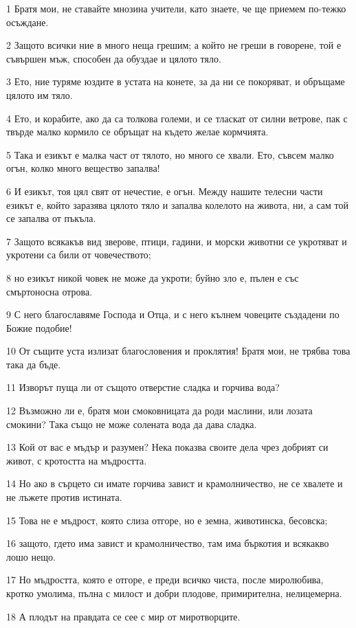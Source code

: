 \par 1 Братя мои, не ставайте мнозина учители, като знаете, че ще приемем по-тежко осъждане.
\par 2 Защото всички ние в много неща грешим; а който не греши в говорене, той е съвършен мъж, способен да обуздае и цялото тяло.
\par 3 Ето, ние туряме юздите в устата на конете, за да ни се покоряват, и обръщаме цялото им тяло.
\par 4 Ето, и корабите, ако да са толкова големи, и се тласкат от силни ветрове, пак с твърде малко кормило се обръщат на където желае кормчията.
\par 5 Така и езикът е малка част от тялото, но много се хвали. Ето, съвсем малко огън, колко много вещество запалва!
\par 6 И езикът, тоя цял свят от нечестие, е огън. Между нашите телесни части езикът е, който заразява цялото тяло и запалва колелото на живота, ни, а сам той се запалва от пъкъла.
\par 7 Защото всякакъв вид зверове, птици, гадини, и морски животни се укротяват и укротени са били от човечеството;
\par 8 но езикът никой човек не може да укроти; буйно зло е, пълен е със смъртоносна отрова.
\par 9 С него благославяме Господа и Отца, и с него кълнем човеците създадени по Божие подобие!
\par 10 От същите уста излизат благословения и проклятия! Братя мои, не трябва това така да бъде.
\par 11 Изворът пуща ли от същото отверстие сладка и горчива вода?
\par 12 Възможно ли е, братя мои смоковницата да роди маслини, или лозата смокини? Така също не може солената вода да дава сладка.
\par 13 Кой от вас е мъдър и разумен? Нека показва своите дела чрез добрият си живот, с кротостта на мъдростта.
\par 14 Но ако в сърцето си имате горчива завист и крамолничество, не се хвалете и не лъжете против истината.
\par 15 Това не е мъдрост, която слиза отгоре, но е земна, животинска, бесовска;
\par 16 защото, гдето има завист и крамолничество, там има бъркотия и всякакво лошо нещо.
\par 17 Но мъдростта, която е отгоре, е преди всичко чиста, после миролюбива, кротко умолима, пълна с милост и добри плодове, примирителна, нелицемерна.
\par 18 А плодът на правдата се сее с мир от миротворците.

